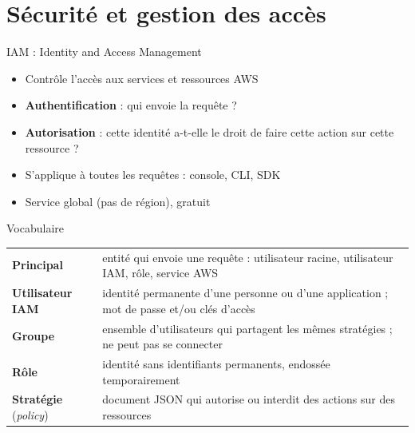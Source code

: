 \section{Sécurité et gestion des accès}

\begin{frame}{IAM : Identity and Access Management}
  \begin{itemize}
    \setlength{\itemsep}{.55em}
    \item Contrôle l'accès aux services et ressources AWS
    \item \textbf{Authentification} : qui envoie la requête ?
    \item \textbf{Autorisation} : cette identité a-t-elle le droit de faire cette action sur cette ressource ?
    \item S'applique à toutes les requêtes : console, CLI, SDK
    \item Service global (pas de région), gratuit
  \end{itemize}
\end{frame}

\begin{frame}{Vocabulaire}
  \renewcommand{\arraystretch}{1.45}
  \begin{tabularx}{\textwidth}{@{}>{\raggedright\arraybackslash}p{3.2cm}>{\raggedright\arraybackslash}X@{}}
    \toprule
    \textbf{Principal} & entité qui envoie une requête : utilisateur racine, utilisateur IAM, rôle, service AWS \\
    \textbf{Utilisateur IAM} & identité permanente d'une personne ou d'une application ; mot de passe et/ou clés d'accès \\
    \textbf{Groupe} & ensemble d'utilisateurs qui partagent les mêmes stratégies ; ne peut pas se connecter \\
    \textbf{Rôle} & identité sans identifiants permanents, endossée temporairement \\
    \textbf{Stratégie} (\emph{policy}) & document JSON qui autorise ou interdit des actions sur des ressources \\ \bottomrule
  \end{tabularx}
\end{frame}

